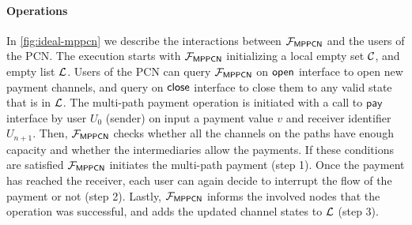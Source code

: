 \paragraph{Operations}
In \cref{fig:ideal-mppcn} we describe the interactions between $\mathcal{F}_{\mathsf{MPPCN}}$ and the 
users of the PCN. The execution starts with $\mathcal{F}_{\mathsf{MPPCN}}$ initializing a local empty 
set $\mathcal{C}$, and empty list $\mathcal{L}$. Users of the PCN can query $\mathcal{F}_{\mathsf{MPPCN}}$ on $\mathsf{open}$ 
interface to open new payment channels, and query on $\mathsf{close}$ interface to close them to any 
valid state that is in $\mathcal{L}$. The multi-path payment operation is initiated with a call to 
$\mathsf{pay}$ interface by user $U_0$ (sender) on input a payment value $v$ and receiver 
identifier $U_{n+1}$. Then, $\mathcal{F}_{\mathsf{MPPCN}}$ checks whether all the channels on the paths 
have enough capacity and whether the intermediaries allow the payments. If these conditions are 
satisfied $\mathcal{F}_{\mathsf{MPPCN}}$ initiates the multi-path payment (step 1). Once the payment has 
reached the receiver, each user can again decide to interrupt the flow of the payment or not 
(step 2). Lastly, $\mathcal{F}_{\mathsf{MPPCN}}$ informs the involved nodes that the operation was 
successful, and adds the updated channel states to $\mathcal{L}$ (step 3).
 

